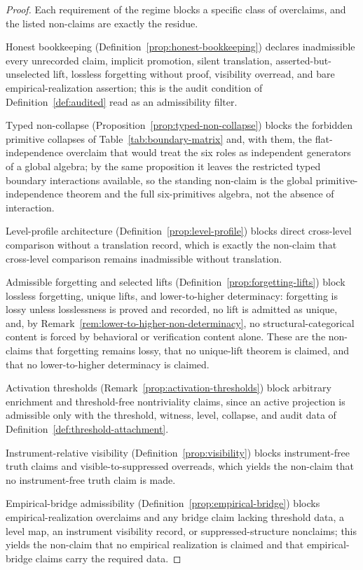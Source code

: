 \documentclass[11pt]{article}
\theoremstyle{definition}
\begin{document}
\begin{proof}
Each requirement of the regime blocks a specific class of overclaims,
and the listed non-claims are exactly the residue.

Honest bookkeeping (Definition~\ref{prop:honest-bookkeeping}) declares
inadmissible every unrecorded claim, implicit promotion, silent
translation, asserted-but-unselected lift, lossless forgetting without
proof, visibility overread, and bare empirical-realization assertion;
this is the audit condition of Definition~\ref{def:audited} read as an
admissibility filter.

Typed non-collapse (Proposition~\ref{prop:typed-non-collapse}) blocks
the forbidden primitive collapses of Table~\ref{tab:boundary-matrix}
and, with them, the flat-independence overclaim that would treat the
six roles as independent generators of a global algebra; by the same
proposition it leaves the restricted typed boundary interactions
available, so the standing non-claim is the global
primitive-independence theorem and the full six-primitives algebra, not
the absence of interaction.

Level-profile architecture (Definition~\ref{prop:level-profile}) blocks
direct cross-level comparison without a translation record, which is
exactly the non-claim that cross-level comparison remains inadmissible
without translation.

Admissible forgetting and selected lifts
(Definition~\ref{prop:forgetting-lifts}) block lossless forgetting,
unique lifts, and lower-to-higher determinacy: forgetting is lossy
unless losslessness is proved and recorded, no lift is admitted as
unique, and, by
Remark~\ref{rem:lower-to-higher-non-determinacy}, no structural-categorical
content is forced by behavioral or verification content alone. These are
the non-claims that forgetting remains lossy, that no unique-lift
theorem is claimed, and that no lower-to-higher determinacy is claimed.

Activation thresholds (Remark~\ref{prop:activation-thresholds}) block
arbitrary enrichment and threshold-free nontriviality claims, since an
active projection is admissible only with the threshold, witness, level,
collapse, and audit data of Definition~\ref{def:threshold-attachment}.

Instrument-relative visibility (Definition~\ref{prop:visibility}) blocks
instrument-free truth claims and visible-to-suppressed overreads, which
yields the non-claim that no instrument-free truth claim is made.

Empirical-bridge admissibility (Definition~\ref{prop:empirical-bridge})
blocks empirical-realization overclaims and any bridge claim lacking
threshold data, a level map, an instrument visibility record, or
suppressed-structure nonclaims; this yields the non-claim that no
empirical realization is claimed and that empirical-bridge claims carry
the required data.


\end{proof}
\end{document}
